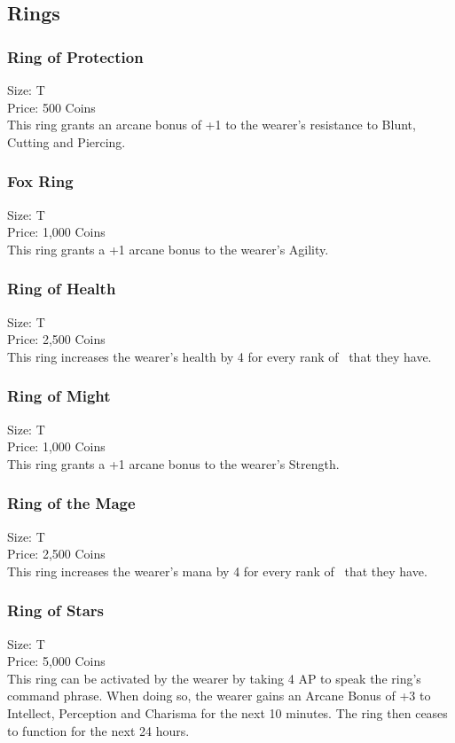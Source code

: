 \subsection{Rings}\label{subsec:rings}

\subsubsection{Ring of Protection}\label{item:ringOfProtection}
Size: T\\
Price: 500 Coins\\
This ring grants an arcane bonus of +1 to the wearer's resistance to Blunt, Cutting and Piercing.

\subsubsection{Fox Ring}\label{item:ringOfFox}
Size: T\\
Price: 1,000 Coins\\
This ring grants a +1 arcane bonus to the wearer's Agility.

\subsubsection{Ring of Health}\label{item:ringOfHealth}
Size: T\\
Price: 2,500 Coins\\
This ring increases the wearer's health by 4 for every rank of~ that they have.

\subsubsection{Ring of Might}\label{item:ringOfMight}
Size: T\\
Price: 1,000 Coins\\
This ring grants a +1 arcane bonus to the wearer's Strength.

\subsubsection{Ring of the Mage}\label{item:ringOfMage}
Size: T\\
Price: 2,500 Coins\\
This ring increases the wearer's mana by 4 for every rank of~ that they have.

\subsubsection{Ring of Stars}\label{item:ringOfStars}
Size: T\\
Price: 5,000 Coins\\
This ring can be activated by the wearer by taking 4 AP to speak the ring's command phrase.
When doing so, the wearer gains an Arcane Bonus of +3 to Intellect, Perception and Charisma for the next 10 minutes.
The ring then ceases to function for the next 24 hours.